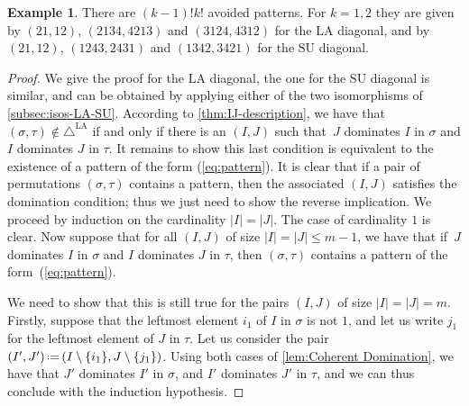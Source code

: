 \documentclass{amsart}
\theoremstyle{definition}
\newtheorem{example}[theorem]{Example}
\newcommand{\eqdef}{\mbox{\,\raisebox{0.2ex}{\scriptsize\ensuremath{\mathrm:}}\ensuremath{=}\,}} %
\newcommand{\SU}{\mathrm{SU}}
\newcommand{\LA}{\mathrm{LA}}
\newcommand{\LAD}{\triangle^{\mathrm{LA}}}
\begin{document}
\begin{example}
There are $(k-1)!k!$ avoided patterns.
For $k=1,2$ they are given by $(21,12)$, $(2134,4213)$ and $(3124,4312)$ for the $\LA$ diagonal, and by $(21,12)$, $(1243,2431)$ and $(1342, 3421)$ for the $\SU$ diagonal.
\end{example}

\begin{proof}
We give the proof for the $\LA$ diagonal, the one for the $\SU$ diagonal is similar, and can be obtained by applying either of the two isomorphisms of \cref{subsec:isos-LA-SU}.
According to \cref{thm:IJ-description}, we have that $(\sigma,\tau) \notin \LAD$ if and only if there is an $(I,J)$ such that~$J$ dominates $I$ in $\sigma$ and $I$ dominates $J$ in $\tau$.
It remains to show this last condition is equivalent to the existence of a pattern of the form (\ref{eq:pattern}).
It is clear that if a pair of permutations $(\sigma,\tau)$ contains a pattern, then the associated $(I,J)$ satisfies the domination condition; thus we just need to show the reverse implication. 
We proceed by induction on the cardinality $|I|=|J|$. 
The case of cardinality $1$ is clear. 
Now suppose that for all $(I,J)$ of size $|I|=|J|\leq m-1$, we have that if~$J$ dominates $I$ in $\sigma$ and $I$ dominates $J$ in $\tau$, then $(\sigma,\tau)$ contains a pattern of the form~(\ref{eq:pattern}).

We need to show that this is still true for the pairs $(I,J)$ of size $|I|=|J|=m$.
Firstly, suppose that the leftmost element $i_1$ of $I$ in $\sigma$ is not $1$, and let us write $j_1$ for the leftmost element of $J$ in $\tau$.
Let us consider the pair $(I',J') \eqdef (I\setminus \{i_1\}, J \setminus \{j_1\})$.
Using both cases of \cref{lem:Coherent Domination}, we have that $J'$ dominates $I'$ in $\sigma$, and $I'$ dominates $J'$ in $\tau$, and we can thus conclude with the induction hypothesis. 


\end{proof}
\end{document}
